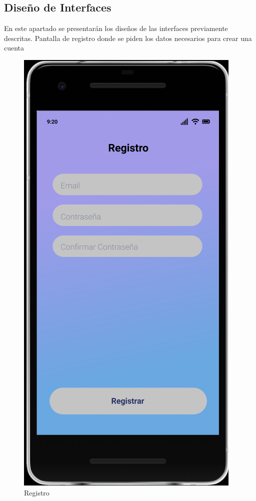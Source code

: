 \documentclass{article}
\begin{document}
\subsection{Diseño de Interfaces}%
En este apartado se presentarán los diseños de las interfaces previamente descritas.
\pagebreak
Pantalla de registro donde se piden los datos necesarios para crear una cuenta
\begin{figure}[H]
    \centering
    \includegraphics[scale=0.8]{imgs/Figma/Registro2} 
    \caption{Registro}
\end{figure}
\end{document}
